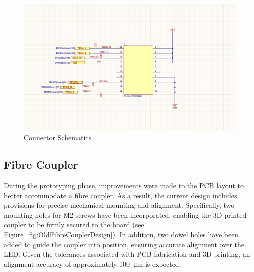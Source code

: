 \documentclass[a4paper,11pt]{article}
\begin{document}
\begin{figure}[htbp]
\centering
\includegraphics[scale=0.5]{Connector.png}
\caption{Connector Schematics\label{fig:Connector}}
\end{figure}


\subsection{Fibre Coupler}

During the prototyping phase, improvements were made to the PCB layout to better accommodate a fibre coupler. As a result, the current design includes provisions for precise mechanical mounting and alignment. Specifically, two mounting holes for M2 screws have been incorporated, enabling the 3D-printed coupler to be firmly secured to the board (see Figure~\ref{fig:OldFibreCouplerDesign}). In addition, two dowel holes have been added to guide the coupler into position, ensuring accurate alignment over the LED. Given the tolerances associated with PCB fabrication and 3D printing, an alignment accuracy of approximately \SI{100}{\micro\metre} is expected.
\end{document}
